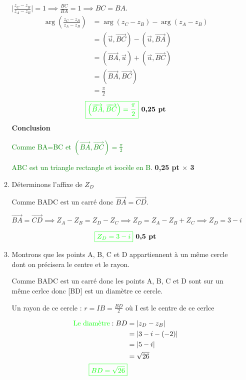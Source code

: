 \documentclass[12pt]{article}
\begin{document}
\begin{enumerate}
\begin{enumerate}
$\mid\frac{z_C - z_B}{z_A - z_B}\mid=1 \implies \frac{BC}{BA}=1\implies BC=BA$.
\begin{align*}
\arg\left( \frac{z_C - z_B}{z_A - z_B}\right) &=\arg\left( z_C - z_B \right) - \arg\left( z_A - z_B \right)\\
&=\left( \vec{u}, \overrightarrow{BC} \right)-\left( \vec{u}, \overrightarrow{BA} \right)\\
&=\left( \overrightarrow{BA}, \vec{u} \right)+\left( \vec{u}, \overrightarrow{BC} \right)\\
&=\left( \overrightarrow{BA}, \overrightarrow{BC} \right)\\
&=\frac{\pi}{2}
\end{align*}
\[
\textcolor{green}{\boxed{\left( \overrightarrow{BA}, \overrightarrow{BC} \right)=\frac{\pi}{2}}}\textbf{ 0,25 pt}
\]
\textbf{Conclusion}

\textcolor{green}{Comme  BA=BC et $\left( \overrightarrow{BA}, \overrightarrow{BC} \right)=\frac{\pi}{2}$}

\textcolor{green}{ABC est un triangle rectangle et isocèle en B}.\textbf{ 0,25 pt $\times$ 3}

\item Déterminons l'affixe de $Z_{D}$

Comme  BADC est un carré donc $\overrightarrow{BA}=\overrightarrow{CD}$.

$\overrightarrow{BA}=\overrightarrow{CD}\implies Z_{A}-Z_{B}=Z_{D}-Z_{C}\implies Z_{D}=Z_{A}-Z_{B}+Z_{C}\implies Z_{D}=3-i$

\[
\textcolor{green}{\boxed{Z_{D}=3-i}}\textbf{ 0,5 pt}
\]

\item Montrons que les points A, B, C et D appartiennent à un même cercle dont on précisera le centre et le rayon.

Comme BADC est un carré donc les points A, B, C et D sont sur un même cerlce donc [BD] est un diamètre ce cercle. 

Un rayon de ce cercle : $r=IB=\frac{BD}{2}$ où I est le centre de ce cerlce

\begin{align*}
\text{\textcolor{green}{Le diamètre}} : BD&=|z_{D}-z_{B}|\\
	&=|3-i-(-2)|\\
	&=|5-i|\\
	&=\sqrt{26}\\
\textcolor{green}{\boxed{BD=\sqrt{26}}}
\end{align*}


\end{enumerate}
\end{enumerate}
\end{document}
